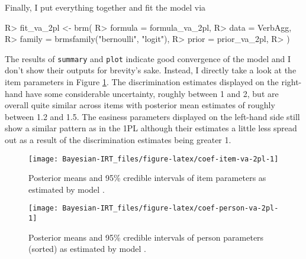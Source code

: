 \documentclass[
]{jss}
\begin{document}
Finally, I put everything together and fit the model via

\begin{CodeChunk}

\begin{CodeInput}
R> fit_va_2pl <- brm(
R>   formula = formula_va_2pl,
R>   data = VerbAgg, 
R>   family = brmsfamily("bernoulli", "logit"),
R>   prior = prior_va_2pl,
R> ) 
\end{CodeInput}
\end{CodeChunk}

The results of \texttt{summary} and \texttt{plot} indicate good
convergence of the model and I don't show their outputs for brevity's
sake. Instead, I directly take a look at the item parameters in Figure
\ref{fig:coef-item-va-2pl}. The discrimination estimates displayed on
the right-hand have some considerable uncertainty, roughly between 1 and
2, but are overall quite similar across items with posterior mean
estimates of roughly between 1.2 and 1.5. The easiness parameters
displayed on the left-hand side still show a similar pattern as in the
1PL although their estimates a little less spread out as a result of the
discrimination estimates being greater 1.

\begin{CodeChunk}
\begin{figure}

{\centering \texttt{[image: Bayesian-IRT\_files/figure-latex/coef-item-va-2pl-1]} 

}

\caption[Posterior means and 95\% credible intervals of item parameters as estimated by model ]{Posterior means and 95\% credible intervals of item parameters as estimated by model .}\label{fig:coef-item-va-2pl}
\end{figure}
\end{CodeChunk}

\begin{CodeChunk}
\begin{figure}

{\centering \texttt{[image: Bayesian-IRT\_files/figure-latex/coef-person-va-2pl-1]} 

}

\caption[Posterior means and 95\% credible intervals of person parameters (sorted) as estimated by model ]{Posterior means and 95\% credible intervals of person parameters (sorted) as estimated by model .}\label{fig:coef-person-va-2pl}
\end{figure}
\end{CodeChunk}
\end{document}
